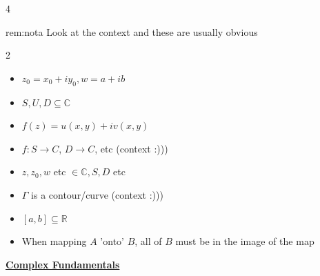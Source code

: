 \documentclass[landscape, 8pt]{extarticle}
\begin{document}
\begin{multicols*}{4}
		
		\begin{rem}[Notation]{rem:nota}{ }
			Look at the context and these are usually obvious 
			\vspace{-12pt}
			\begin{multicols}{2}
				\begin{itemize}
					\item $z_0 = x_0+iy_0, w = a+ib$
					\item $S, U, D \subseteq \mathbb{C}$
					\item $f(z) = u(x, y) + iv(x, y)$
					\item $f: S \to C$, $D \to C$, etc (context :)))
					\item $z, z_0, w$ etc $\in \mathbb{C}, S, D$ etc
					\item $\Gamma$ is a contour/curve (context :)))
					\item $[a, b] \subseteq \mathbb{R}$
					\item When mapping $A$ 'onto' $B$, all of $B$ must be in the image of the map
				\end{itemize}
			\end{multicols}
			
			
		\end{rem}
		
		
		
		
		{\footnotesize \textbf{\underline{Complex Fundamentals}}}
		

\end{multicols*}
\end{document}

